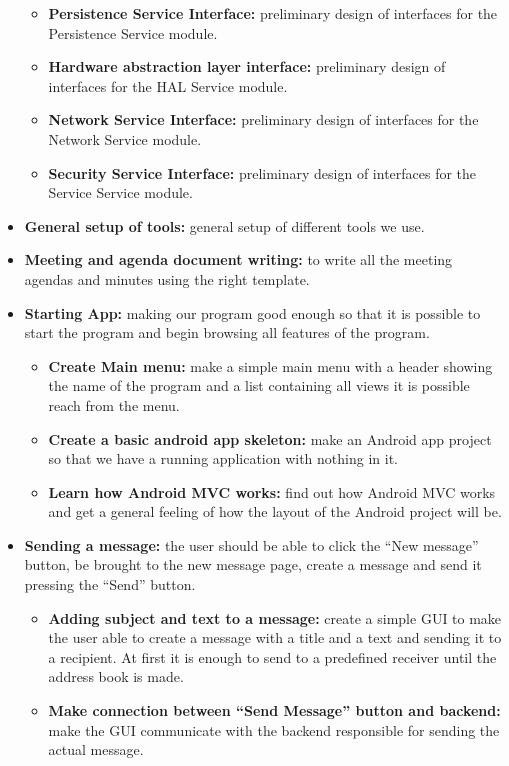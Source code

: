 \begin{itemize}
\begin{itemize}
\item{}\textbf{Persistence Service Interface:} preliminary design of interfaces for the Persistence Service module.
\item{}\textbf{Hardware abstraction layer interface:} preliminary design of interfaces for the HAL Service module.
\item{}\textbf{Network Service Interface:} preliminary design of interfaces for the Network Service module.
\item{}\textbf{Security Service Interface:} preliminary design of interfaces for the Service Service module.
\end{itemize}
\item{}\textbf{General setup of tools:} general setup of different tools we use.
\item{}\textbf{Meeting and agenda document writing:} to write all the meeting agendas and minutes using the right template.
\item{}\textbf{Starting App:} making our program good enough so that it is possible to start the program and begin browsing all features of the program.
\begin{itemize}
\item{}\textbf{Create Main menu:} make a simple main menu with a header showing the name of the program and a list containing all views it is possible reach from the menu.
\item{}\textbf{Create a basic android app skeleton:} make an Android app project so that we have a running application with nothing in it.
\item{}\textbf{Learn how Android MVC works:} find out how Android MVC works and get a general feeling of how the layout of the Android project will be.
\end{itemize}
\item{}\textbf{Sending a message:} the user should be able to click the “New message” button, be brought to the new message page, create a message and send it pressing the “Send” button.
\begin{itemize}
\item{}\textbf{Adding subject and text to a message:} create a simple GUI to make the user able to create a message with a title and a text and sending it to a recipient. At first it is enough to send to a predefined receiver until the address book is made.
\item{}\textbf{Make connection between “Send Message” button and backend:} make the GUI communicate with the backend responsible for sending the actual message.

\end{itemize}
\end{itemize}
